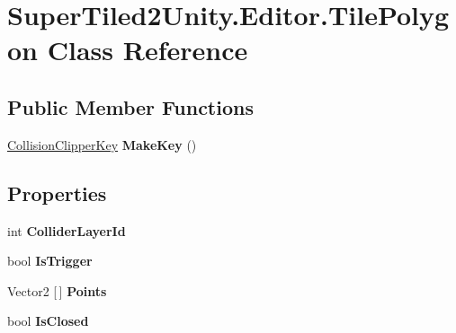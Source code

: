 \hypertarget{class_super_tiled2_unity_1_1_editor_1_1_tile_polygon}{}\section{Super\+Tiled2\+Unity.\+Editor.\+Tile\+Polygon Class Reference}
\label{class_super_tiled2_unity_1_1_editor_1_1_tile_polygon}
\subsection*{Public Member Functions}
\begin{DoxyCompactItemize}
\item 
\mbox{\label{class_super_tiled2_unity_1_1_editor_1_1_tile_polygon_a266ba101bca89c276e30c916cd533621}} 
\mbox{\hyperlink{struct_super_tiled2_unity_1_1_editor_1_1_collision_clipper_key}{Collision\+Clipper\+Key}} {\bfseries Make\+Key} ()
\end{DoxyCompactItemize}
\subsection*{Properties}
\begin{DoxyCompactItemize}
\item 
\mbox{\label{class_super_tiled2_unity_1_1_editor_1_1_tile_polygon_a8caffa1686916e780777d5476229c94f}} 
int {\bfseries Collider\+Layer\+Id}
\item 
\mbox{\label{class_super_tiled2_unity_1_1_editor_1_1_tile_polygon_ac83583a2981dadfb1dd3ac1e50d1d752}} 
bool {\bfseries Is\+Trigger}
\item 
\mbox{\label{class_super_tiled2_unity_1_1_editor_1_1_tile_polygon_a63d9f35c43e9e57e96910140984ebb8d}} 
Vector2 \mbox{[}$\,$\mbox{]} {\bfseries Points}
\item 
\mbox{\label{class_super_tiled2_unity_1_1_editor_1_1_tile_polygon_a6bab19484d3168eb725f4d6810026ea2}} 
bool {\bfseries Is\+Closed}
\end{DoxyCompactItemize}


